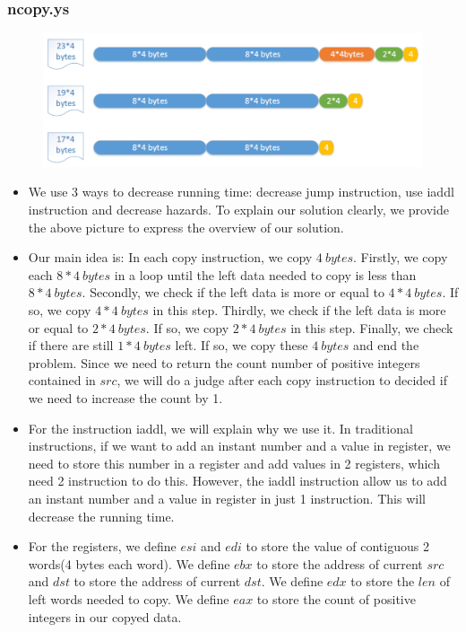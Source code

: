 \documentclass[12pt,a4paper]{article}
\theoremstyle{definition}
\numberwithin{equation}{section}
\numberwithin{figure}{section}
\begin{document}
\subsubsection{ncopy.ys}
\begin{figure}[H]
	\centering
	\includegraphics[width=12cm]{Gantt.pdf}
\end{figure}
\begin{itemize}
	\item We use 3 ways to decrease running time: decrease jump instruction, use iaddl instruction and decrease hazards. To explain our solution clearly, we provide the above picture to express the overview of our solution.
	\item Our main idea is: In each copy instruction, we copy $4\ bytes$. Firstly, we copy each $8*4\ bytes$ in a loop until the left data needed to copy is less than $8*4\ bytes$. Secondly, we check if the left data is more or equal to $4*4\ bytes$. If so, we copy $4*4\ bytes$ in this step. Thirdly, we check if the left data is more or equal to $2*4\ bytes$. If so, we copy $2*4\ bytes$ in this step. Finally, we check if there are still $1*4\ bytes$ left. If so, we copy these $4\ bytes$ and end the problem. Since we need to return the count number of positive integers contained in $src$, we will do a judge after each copy instruction to decided if we need to increase the count by 1.
	\item For the instruction iaddl, we will explain why we use it. In traditional instructions, if we want to add an instant number and a value in register, we need to store this number in a register and add values in 2 registers, which need 2 instruction to do this. However, the iaddl instruction allow us to add an instant number and a value in register in just 1 instruction. This will decrease the running time.
	\item For the registers, we define $esi$ and $edi$ to store the value of contiguous 2 words(4 bytes each word). We define $ebx$ to store the address of current $src$ and $dst$ to store the address of current $dst$. We define $edx$ to store the $len$ of left words needed to copy. We define $eax$ to store the count of positive integers in our copyed data.

\end{itemize}
\end{document}
